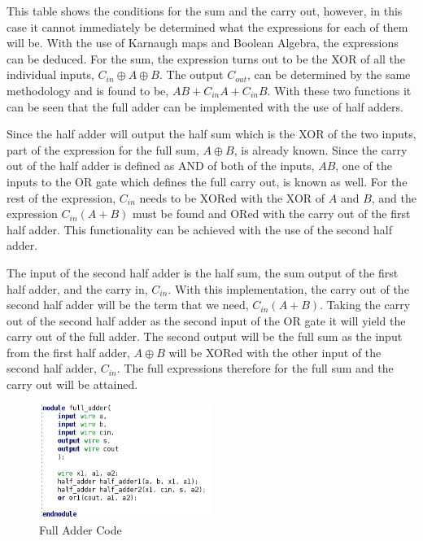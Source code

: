 \documentclass[12pt]{article}
\begin{document}
    \par This table shows the conditions for the sum and the carry out, however,
    in this case it cannot immediately be determined what the expressions for
    each of them will be. With the use of Karnaugh maps and Boolean Algebra, the
    expressions can be deduced. For the sum, the expression turns out to be the
    XOR of all the individual inputs, $C_{in} \oplus A \oplus B$. The output
    $C_{out}$, can be determined by the same methodology and is found to be, $AB
    + C_{in}A + C_{in}B$. With these two functions it can be seen that the full
    adder can be implemented with the use of half adders.
    \par Since the half adder will output the half sum which is the XOR of the
    two inputs, part of the expression for the full sum, $A \oplus B$, is
    already known. Since the carry out of the half adder is defined as AND of
    both of the inputs, $AB$, one of the inputs to the OR gate which defines the
    full carry out, is known as well. For the rest of the expression, $C_{in}$
    needs to be XORed with the XOR of $A$ and $B$, and the expression
    $C_{in}(A+B)$ must be found and ORed with the carry out of the first half
    adder. This functionality can be achieved with the use of the second half
    adder.
    \par The input of the second half adder is the half sum, the sum output of
    the first half adder, and the carry in, $C_{in}$. With this implementation,
    the carry out of the second half adder will be the term that we need,
    $C_{in}(A+B)$. Taking the carry out of the second half adder as the second
    input of the OR gate it will yield the carry out of the full adder.  The
    second output will be the full sum as the input from the first half adder,
    $A \oplus B$ will be XORed with the other input of the second half adder,
    $C_{in}$. The full expressions therefore for the full sum and the carry out
    will be attained.
    \begin{figure}[h]
        \centering
        \includegraphics[width=0.5\textwidth]{Full Adder Code.png}
        \caption{Full Adder Code}
        \label{fig:Full-Adder-Code}
    \end{figure}
\end{document}
